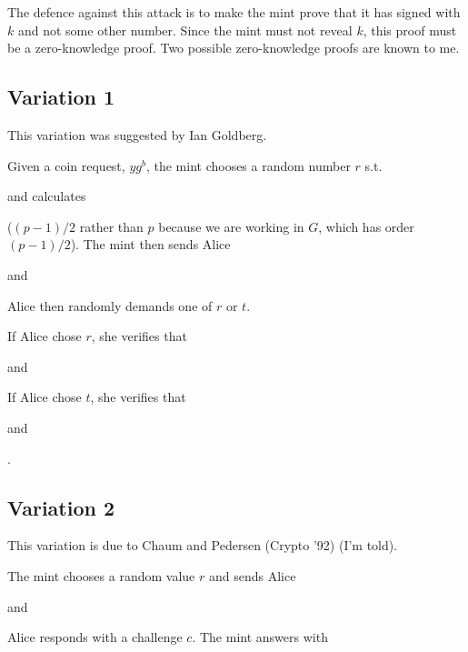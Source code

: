 \documentclass[a4paper,titlepage]{article}
\begin{document}
The defence against this attack is to make the mint prove that it has
signed with $k$ and not some other number. Since the mint must not
reveal $k$, this proof must be a zero-knowledge proof. Two possible
zero-knowledge proofs are known to me.

\subsection{Variation 1}

This variation was suggested by Ian Goldberg.

Given a coin request, $y g^b$, the mint chooses a random number $r$
 s.t.


and calculates


($(p-1)/2$ rather than $p$ because we are working in $G$, which has order
$(p-1)/2$). The mint then sends Alice


and


Alice then randomly demands one of $r$ or $t$.

If Alice chose $r$, she verifies that


and


If Alice chose $t$, she verifies that


and

.

\subsection{Variation 2}

This variation is due to Chaum and Pedersen (Crypto '92) (I'm told).

The mint chooses a random value $r$ and sends Alice


and


Alice responds with a challenge $c$. The mint answers with

\end{document}
